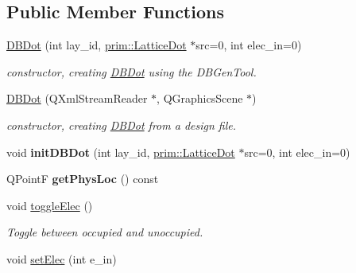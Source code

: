 \subsection*{Public Member Functions}
\begin{DoxyCompactItemize}
\item 
\hyperlink{classprim_1_1DBDot_abf4a801bc53ad15aeb6b9463e223e9b2}{D\+B\+Dot} (int lay\+\_\+id, \hyperlink{classprim_1_1LatticeDot}{prim\+::\+Lattice\+Dot} $\ast$src=0, int elec\+\_\+in=0)\hypertarget{classprim_1_1DBDot_abf4a801bc53ad15aeb6b9463e223e9b2}{}\label{classprim_1_1DBDot_abf4a801bc53ad15aeb6b9463e223e9b2}

\begin{DoxyCompactList}\small\item\em constructor, creating \hyperlink{classprim_1_1DBDot}{D\+B\+Dot} using the D\+B\+Gen\+Tool. \end{DoxyCompactList}\item 
\hyperlink{classprim_1_1DBDot_acfb0c7c5503e1559c3287c2d8f2a9579}{D\+B\+Dot} (Q\+Xml\+Stream\+Reader $\ast$, Q\+Graphics\+Scene $\ast$)\hypertarget{classprim_1_1DBDot_acfb0c7c5503e1559c3287c2d8f2a9579}{}\label{classprim_1_1DBDot_acfb0c7c5503e1559c3287c2d8f2a9579}

\begin{DoxyCompactList}\small\item\em constructor, creating \hyperlink{classprim_1_1DBDot}{D\+B\+Dot} from a design file. \end{DoxyCompactList}\item 
void {\bfseries init\+D\+B\+Dot} (int lay\+\_\+id, \hyperlink{classprim_1_1LatticeDot}{prim\+::\+Lattice\+Dot} $\ast$src=0, int elec\+\_\+in=0)\hypertarget{classprim_1_1DBDot_a47fe9dc50d797d35a2cb48dd4ca512d1}{}\label{classprim_1_1DBDot_a47fe9dc50d797d35a2cb48dd4ca512d1}

\item 
Q\+PointF {\bfseries get\+Phys\+Loc} () const \hypertarget{classprim_1_1DBDot_aa4bdc68527c825257e42bae1ef06c299}{}\label{classprim_1_1DBDot_aa4bdc68527c825257e42bae1ef06c299}

\item 
void \hyperlink{classprim_1_1DBDot_afbb7f014b561e3b75b9b1d81dee4833c}{toggle\+Elec} ()\hypertarget{classprim_1_1DBDot_afbb7f014b561e3b75b9b1d81dee4833c}{}\label{classprim_1_1DBDot_afbb7f014b561e3b75b9b1d81dee4833c}

\begin{DoxyCompactList}\small\item\em Toggle between occupied and unoccupied. \end{DoxyCompactList}\item 
void \hyperlink{classprim_1_1DBDot_a9b3da606577dc4a76aabf18e4a064bb6}{set\+Elec} (int e\+\_\+in)\hypertarget{classprim_1_1DBDot_a9b3da606577dc4a76aabf18e4a064bb6}{}\label{classprim_1_1DBDot_a9b3da606577dc4a76aabf18e4a064bb6}


\end{DoxyCompactItemize}
